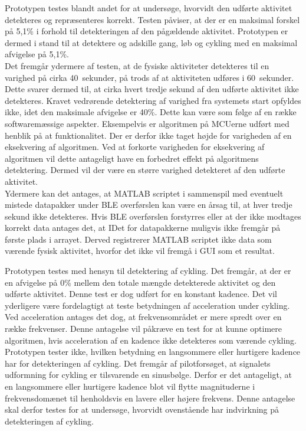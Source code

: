 Prototypen testes blandt andet for at undersøge, hvorvidt den udførte aktivitet detekteres og repræsenteres korrekt. Testen påviser, at der er en maksimal forskel på 5,1\% i forhold til detekteringen af den pågældende aktivitet. Prototypen er dermed i stand til at detektere og adskille gang, løb og cykling med en maksimal afvigelse på 5,1\%. \\
Det fremgår ydermere af testen, at de fysiske aktiviteter detekteres til en varighed på cirka 40~sekunder, på trods af at aktiviteten udføres i 60~sekunder. Dette svarer dermed til, at cirka hvert tredje sekund af den udførte aktivitet ikke detekteres. Kravet vedrørende detektering af varighed fra systemets start opfyldes ikke, idet den maksimale afvigelse er 40\%. Dette kan være som følge af en række softwaremæssige aspekter. Eksempelvis er algoritmen på MCUerne udført med henblik på at funktionalitet. Der er derfor ikke taget højde for varigheden af en eksekvering af algoritmen. Ved at forkorte varigheden for eksekvering af algoritmen vil dette antageligt have en forbedret effekt på algoritmens detektering. Dermed vil der være en større varighed detekteret af den udførte aktivitet. \\
Ydermere kan det antages, at MATLAB scriptet i sammenspil med eventuelt mistede datapakker under BLE overførslen kan være en årsag til, at hver tredje sekund ikke detekteres. Hvis BLE overførslen forstyrres eller at der ikke modtages korrekt data antages det, at IDet for datapakkerne muligvis ikke fremgår på første plads i arrayet. Derved registrerer MATLAB scriptet ikke data som værende fysisk aktivitet, hvorfor det ikke vil fremgå i GUI som et resultat. 

Prototypen testes med hensyn til detektering af cykling. Det fremgår, at der er en afvigelse på 0\% mellem den totale mængde detekterede aktivitet og den udførte aktivitet. Denne test er dog udført for en konstant kadence. Det vil yderligere være fordelagtigt at teste betydningen af acceleration under cykling. Ved acceleration antages det dog, at frekvensområdet er mere spredt over en række frekvenser. Denne antagelse vil påkræve en test for at kunne optimere algoritmen, hvis acceleration af en kadence ikke detekteres som værende cykling. \\
Prototypen tester ikke, hvilken betydning en langsommere eller hurtigere kadence har for detekteringen af cykling. Det fremgår af pilotforsøget, at signalets udformning for cykling er tilsvarende en sinusbølge. Derfor er det antageligt, at en langsommere eller hurtigere kadence blot vil flytte magnituderne i frekvensdomænet til henholdsvis en lavere eller højere frekvens. Denne antagelse skal derfor testes for at undersøge, hvorvidt ovenstående har indvirkning på detekteringen af cykling.

